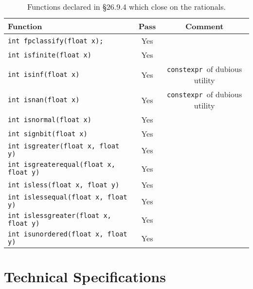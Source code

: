 \documentclass[prd,preprint,amsmath,amssymb,nofootinbib,eqsecnum]{revtex4-1}
\newcommand{\code}[1]{{\tt #1}}
\newcommand{\constexpr}{\code{constexpr}}
\begin{document}
\begin{table}[h]
	\begin{tabular}{lcc}
		Function & Pass & Comment
	\\
	\hline \hline
		\code{int fpclassify(float x);} & Yes &
	\\
	\hline
		\code{int isfinite(float x)} & Yes &
	\\
	\hline
		\code{int isinf(float x)} & Yes & \constexpr\ of dubious utility 
	\\
	\hline
		\code{int isnan(float x)} & Yes & \constexpr\ of dubious utility 
	\\
	\hline
		\code{int isnormal(float x)} & Yes &
	\\
	\hline
		\code{int signbit(float x)} & Yes &
	\\
	\hline
		\code{int isgreater(float x, float y)} & Yes &
	\\
	\hline
		\code{int isgreaterequal(float x, float y)} & Yes &
	\\
	\hline
		\code{int isless(float x, float y)} & Yes &
	\\
	\hline
		\code{int islessequal(float x, float y)} & Yes &
	\\
	\hline
		\code{int islessgreater(float x, float y)} & Yes &
	\\
	\hline
		\code{int isunordered(float x, float y)} & Yes &
	\end{tabular}
\caption{Functions declared in \S 26.9.4 which close on the rationals.}
\label{tab:26.9.4}
\end{table}

\section{Technical Specifications}
\end{document}
